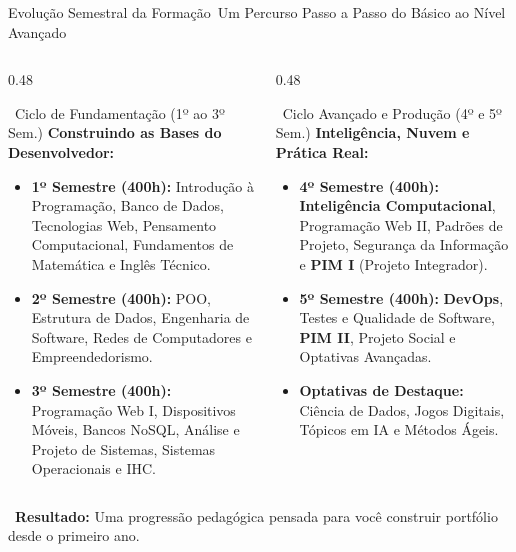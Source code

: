 \begin{frame}{Evolução Semestral da Formação}{\faStream\ Um Percurso Passo a Passo do Básico ao Nível Avançado}
  \begin{columns}[t]
    \begin{column}{0.48\textwidth}
      \begin{greencard}{\faSeedling\ Ciclo de Fundamentação (1º ao 3º Sem.)}
        \scriptsize
        \textbf{Construindo as Bases do Desenvolvedor:}
        \begin{itemize}\setlength{\itemsep}{0.2em}
          \item \textbf{1º Semestre (400h):} Introdução à Programação, Banco de Dados, Tecnologias Web, Pensamento Computacional, Fundamentos de Matemática e Inglês Técnico.
          \item \textbf{2º Semestre (400h):} POO, Estrutura de Dados, Engenharia de Software, Redes de Computadores e Empreendedorismo.
          \item \textbf{3º Semestre (400h):} Programação Web I, Dispositivos Móveis, Bancos NoSQL, Análise e Projeto de Sistemas, Sistemas Operacionais e IHC.
        \end{itemize}
      \end{greencard}
    \end{column}
    
    \begin{column}{0.48\textwidth}
      \begin{bluecard}{\faRocket\ Ciclo Avançado e Produção (4º e 5º Sem.)}
        \scriptsize
        \textbf{Inteligência, Nuvem e Prática Real:}
        \begin{itemize}\setlength{\itemsep}{0.2em}
          \item \textbf{4º Semestre (400h):} \textbf{Inteligência Computacional}, Programação Web II, Padrões de Projeto, Segurança da Informação e \textbf{PIM I} (Projeto Integrador).
          \item \textbf{5º Semestre (400h):} \textbf{DevOps}, Testes e Qualidade de Software, \textbf{PIM II}, Projeto Social e Optativas Avançadas.
          \item \textbf{Optativas de Destaque:} Ciência de Dados, Jogos Digitais, Tópicos em IA e Métodos Ágeis.
        \end{itemize}
      \end{bluecard}
    \end{column}
  \end{columns}
  
  \vspace{0.15cm}
  \begin{center}
    \scriptsize \textcolor{IFCEDarkGreen}{\faCheckCircle\ \textbf{Resultado:} Uma progressão pedagógica pensada para você construir portfólio desde o primeiro ano.}
  \end{center}
\end{frame}
